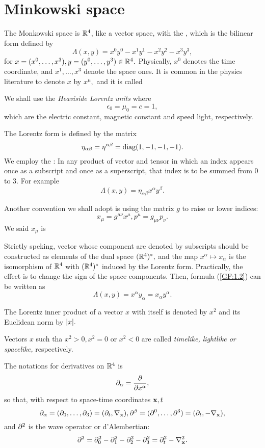 \section{Minkowski space}

The Monkowski space is $\mathbb R^{4}$, like a vector space, with the , which is the bilinear form defined by 
$$
\Lambda(x,y)=x^{0}y^{0}-x^{1}y^{1}-x^{2}y^{2}-x^{3}y^{3},
$$
for $x=(x^{0},\dots,x^{3}), y=(y^{0},\dots,y^{3})\in \mathbb R^{4}.$ Physically, $x^{0}$ denotes the time coordinate, and $x^{1},\dots,x^{3}$ denote the space ones. It is common in the physics literature to denote $x$ by $x^{\mu},$ and it is called 

\begin{rem}
We shall use the \emph{Heaviside Lorentz units} where \[\epsilon_{0}=\mu_0=c=1,\] which are the electric constant, magnetic constant and speed light, respectively.
\end{rem}

The Lorentz form is defined by the matrix 
\begin{equation}
\label{GF:1.1}
\eta_{\alpha \beta}=\eta^{\alpha \beta}= \operatorname{diag}(1,-1,-1,-1).
\end{equation}
We employ the : In any product of vector and tensor in which  an index appears once as a subscript and once as a superscript, that index is to be summed from 0 to 3. For example
\begin{equation}
\label{GF:1.2}
\Lambda(x,y)=\eta_{\alpha \beta}x^{\alpha}y^{\beta}.
\end{equation}

Another convention we shall adopt is using the matrix $g$ to raise or lower indices:
$$
x_{\mu}=g^{\mu \nu} x^{\mu}, p^{\mu}=g_{\mu \nu} p_{\nu}.
$$
We said $x_{\mu}$ is  

Strictly speking, vector whose component are denoted by subscripts should be constructed as elements of the dual space $(\mathbb R^{4})^*,$ and the map $x^{\alpha} \mapsto x_{\alpha}$ is the isomorphism of $\mathbb R^{4}$ with $(\mathbb R^{4})^*$ induced by the Lorentz form. Practically, the effect is to change the sign of the space components.
Then, formula (\ref{GF:1.2}) can be written as 
\[\Lambda(x,y)=x^{\alpha}y_{\alpha}=x_{\alpha}y^{\alpha}.\]
\begin{rem}
The Lorentz inner product of a vector $x$ with itself is denoted by $x^{2}$ and its Euclidean norm by $\lvert x \rvert.$

Vectors $x$ such tha $x^{2}> 0, x^{2}=0$ or $x^{2}<0$ are called \emph{timelike, lightlike or spacelike,} respectively.
\end{rem}

The notations for derivatives on $\mathbb R^{4}$ is \[\partial _{\alpha}= \frac{\partial}{\partial x^{\alpha}},\] so that, with respect to space-time coordinates $\textbf{x}, t$
\begin{equation}
\label{GF:1.3}
\partial_{\alpha}=(\partial_{0}, \dots, \partial_{3})=(\partial_{t}, \nabla_{\textbf{x}}), \partial^{\beta}=(\partial^{0}, \dots, \partial^{3})=(\partial_{t}, -\nabla_{\textbf{x}}),
\end{equation}
and $\partial^{2}$ is the wave operator or d'Alembertian:
$$
\partial^{2}=\partial_{0}^{2}-\partial_{1}^{2}-\partial_{2}^{2}-\partial_{3}^{2}=\partial_{t}^{2}-\nabla^{2}_{\textbf{x}}.
$$